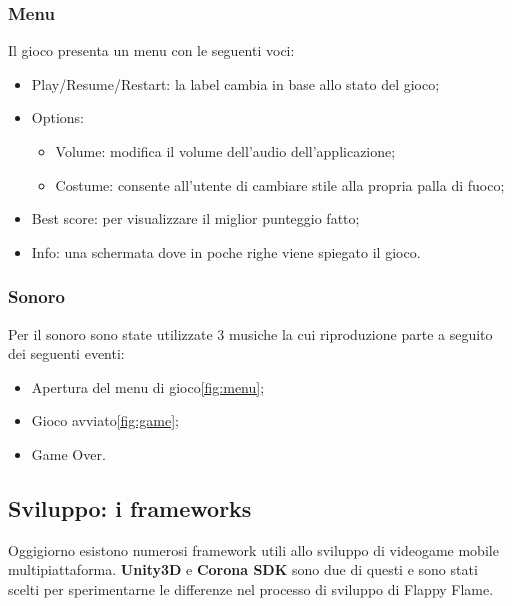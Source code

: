 		\subsubsection{Menu}
			Il gioco presenta un menu con le seguenti voci:
			\begin{itemize}
				\item Play/Resume/Restart: la label cambia in base allo stato del gioco;
				\item Options:
				\begin{itemize}
					\item Volume: modifica il volume dell'audio dell'applicazione;
					\item Costume: consente all'utente di cambiare stile alla propria palla di fuoco;
				\end{itemize}
				\item Best score: per visualizzare il miglior punteggio fatto;
				\item Info: una schermata dove in poche righe viene spiegato il gioco.
			\end{itemize}
		
		\subsubsection{Sonoro}
			Per il sonoro sono state utilizzate 3 musiche la cui riproduzione parte a seguito dei seguenti eventi:
			\begin{itemize}
				\item Apertura del menu di gioco\ref{fig:menu};
				\item Gioco avviato\ref{fig:game};
				\item Game Over.
			\end{itemize}
	

	
	\subsection{Sviluppo: i frameworks}
		Oggigiorno esistono numerosi framework utili allo sviluppo di videogame mobile multipiattaforma. \textbf{Unity3D} e \textbf{Corona SDK} sono due di questi e sono stati scelti per sperimentarne le differenze nel processo di sviluppo di Flappy Flame.
		
